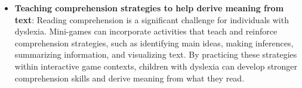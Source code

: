 \begin{itemize}
    \item \textbf{Teaching comprehension strategies to help derive meaning from text}: Reading comprehension is a significant challenge for individuals with dyslexia. Mini-games can incorporate activities that teach and reinforce comprehension strategies, such as identifying main ideas, making inferences, summarizing information, and visualizing text. By practicing these strategies within interactive game contexts, children with dyslexia can develop stronger comprehension skills and derive meaning from what they read. \cite{dyslexiaUnderstanding}
\end{itemize}


